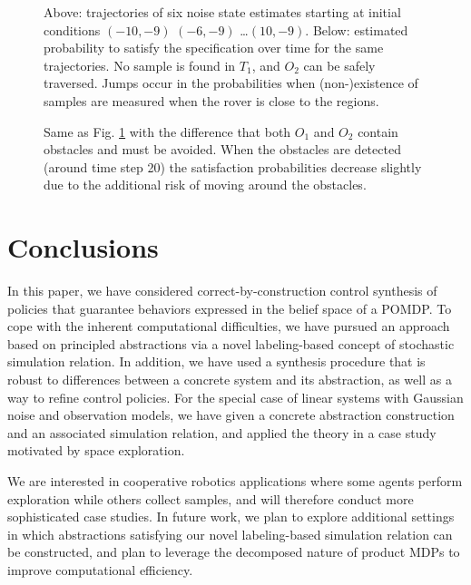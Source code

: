 \documentclass{ifacconf}
\newcommand{\red}[1]{{\color{red} #1}}
\begin{document}
\begin{figure}
  \footnotesize
  \setlength\figurewidth{\columnwidth}
  \setlength{}

  
  \setlength{}

  
  \caption{Above: trajectories of six noise state estimates starting at initial conditions $(-10, -9)$ $(-6, -9)$ \ldots $(10,-9)$. Below: estimated probability to satisfy the specification over time for the same trajectories. No sample is found in $T_1$, and $O_2$ can be safely traversed. Jumps occur in the probabilities when (non-)existence of samples are measured when the rover is close to the regions.}
  \label{fig:exp1}
\end{figure}

\begin{figure}
  \footnotesize
  \setlength\figurewidth{\columnwidth}
  \setlength{}

  

  \setlength{}

  
  \caption{Same as Fig. \ref{fig:exp1} with the difference that both $O_1$ and $O_2$ contain obstacles and must be avoided. When the obstacles are detected (around time step 20) the satisfaction probabilities decrease slightly due to the additional risk of moving around the obstacles.}
  \label{fig:exp2}
\end{figure}


\section{Conclusions}
\label{sec:conclusions}

In this paper,  we have considered correct-by-construction control synthesis of policies that guarantee behaviors expressed in the belief space of a POMDP.  To cope with the inherent computational difficulties, we have pursued an approach based on principled abstractions via a novel labeling-based concept of stochastic simulation relation. In addition, we have used a synthesis procedure that is robust to differences between a concrete system and its abstraction, as well as a way to refine control policies. For the special case of linear systems with Gaussian noise and observation models, we have given a concrete abstraction construction and an associated simulation relation, and applied the theory in a case study motivated by space exploration.

We are interested in cooperative robotics applications where some agents perform exploration while others collect samples, and will therefore conduct more sophisticated case studies. In future work, we  plan to explore additional settings in which abstractions satisfying our novel labeling-based simulation relation can be constructed, and plan to leverage the \red{decomposed nature} of product MDPs to improve computational efficiency.


\end{document}
